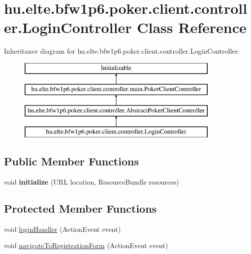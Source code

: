 \hypertarget{classhu_1_1elte_1_1bfw1p6_1_1poker_1_1client_1_1controller_1_1_login_controller}{}\section{hu.\+elte.\+bfw1p6.\+poker.\+client.\+controller.\+Login\+Controller Class Reference}
\label{classhu_1_1elte_1_1bfw1p6_1_1poker_1_1client_1_1controller_1_1_login_controller}
Inheritance diagram for hu.\+elte.\+bfw1p6.\+poker.\+client.\+controller.\+Login\+Controller\+:\begin{figure}[H]
\begin{center}
\leavevmode
\includegraphics[height=4.000000cm]{classhu_1_1elte_1_1bfw1p6_1_1poker_1_1client_1_1controller_1_1_login_controller}
\end{center}
\end{figure}
\subsection*{Public Member Functions}
\begin{DoxyCompactItemize}
\item 
\hypertarget{classhu_1_1elte_1_1bfw1p6_1_1poker_1_1client_1_1controller_1_1_login_controller_ab11dd67c03dca3990cc247eee9ba273e}{}void {\bfseries initialize} (U\+R\+L location, Resource\+Bundle resources)\label{classhu_1_1elte_1_1bfw1p6_1_1poker_1_1client_1_1controller_1_1_login_controller_ab11dd67c03dca3990cc247eee9ba273e}

\end{DoxyCompactItemize}
\subsection*{Protected Member Functions}
\begin{DoxyCompactItemize}
\item 
void \hyperlink{classhu_1_1elte_1_1bfw1p6_1_1poker_1_1client_1_1controller_1_1_login_controller_a6560a07766f3ae764fbb3e3956cf96b7}{login\+Handler} (Action\+Event event)
\item 
void \hyperlink{classhu_1_1elte_1_1bfw1p6_1_1poker_1_1client_1_1controller_1_1_login_controller_a2c09af0c6be35336b875431d86638b49}{navigate\+To\+Registration\+Form} (Action\+Event event)
\end{DoxyCompactItemize}
